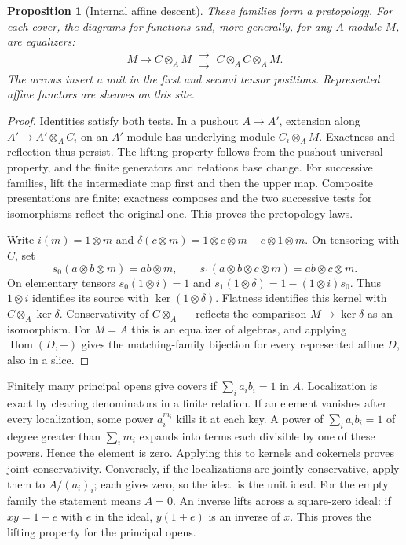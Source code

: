 \documentclass[11pt,a4paper]{article}
\newtheorem{proposition}[proposition]{Proposition}
\theoremstyle{definition}
\theoremstyle{remark}\newaliascnt{remark}{theorem}
\newcommand{\Hom}{\operatorname{Hom}}
\numberwithin{equation}{section}
\begin{document}
\begin{proposition}[Internal affine descent]\label{prop:affine-descent}
These families form a pretopology. For each cover, the diagrams for functions and, more generally, for any $A$-module $M$, are equalizers:
\[
 M\longrightarrow C\otimes_A M
       \ \substack{\longrightarrow\\[-4pt]\longrightarrow}\ 
                 C\otimes_A C\otimes_A M .
\]
The arrows insert a unit in the first and second tensor positions. Represented affine functors are sheaves on this site.
\end{proposition}
\begin{proof}
Identities satisfy both tests. In a pushout $A\to A'$, extension along $A'\to A'\otimes_A C_i$ on an $A'$-module has underlying module $C_i\otimes_A M$. Exactness and reflection thus persist. The lifting property follows from the pushout universal property, and the finite generators and relations base change. For successive families, lift the intermediate map first and then the upper map. Composite presentations are finite; exactness composes and the two successive tests for isomorphisms reflect the original one. This proves the pretopology laws.

Write \(i(m)=1\otimes m\) and \(\delta(c\otimes m)=1\otimes c\otimes m-c\otimes1\otimes m\). On tensoring with \(C\), set
\[
 s_0(a\otimes b\otimes m)=ab\otimes m,\qquad
 s_1(a\otimes b\otimes c\otimes m)=ab\otimes c\otimes m .
\]
On elementary tensors \(s_0(1\otimes i)=1\) and
\(s_1(1\otimes\delta)=1-(1\otimes i)s_0\). Thus \(1\otimes i\) identifies its source with \(\ker(1\otimes\delta)\). Flatness identifies this kernel with \(C\otimes_A\ker\delta\). Conservativity of \(C\otimes_A-\) reflects the comparison \(M\to\ker\delta\) as an isomorphism. For \(M=A\) this is an equalizer of algebras, and applying \(\Hom(D,-)\) gives the matching-family bijection for every represented affine \(D\), also in a slice.
\end{proof}
Finitely many principal opens give covers if $\sum_i a_i b_i=1$ in $A$. Localization is exact by clearing denominators in a finite relation. If an element vanishes after every localization, some power $a_i^{m_i}$ kills it at each key. A power of $\sum_i a_i b_i=1$ of degree greater than $\sum_i m_i$ expands into terms each divisible by one of these powers. Hence the element is zero. Applying this to kernels and cokernels proves joint conservativity. Conversely, if the localizations are jointly conservative, apply them to $A/(a_i)_i$; each gives zero, so the ideal is the unit ideal. For the empty family the statement means $A=0$. An inverse lifts across a square-zero ideal: if $xy=1-e$ with $e$ in the ideal, $y(1+e)$ is an inverse of $x$. This proves the lifting property for the principal opens.
\end{document}
